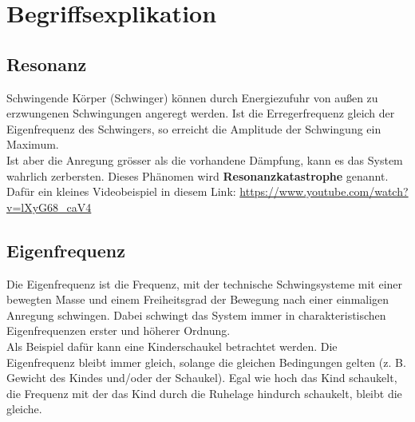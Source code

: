 \chapter{Begriffsexplikation}
\thispagestyle{fancy}
\label{chap:begriffsexplikation}
\section*{Resonanz}
\glqq Schwingende Körper (Schwinger) können durch Energiezufuhr von außen zu erzwungenen Schwingungen angeregt werden. Ist die Erregerfrequenz gleich der Eigenfrequenz des Schwingers, so erreicht die Amplitude der Schwingung ein Maximum.\grqq\: \cite{resonanz}\\
Ist aber die Anregung grösser als die vorhandene Dämpfung, kann es das System wahrlich zerbersten. Dieses Phänomen wird \textbf{Resonanzkatastrophe} genannt. \\
Dafür ein kleines Videobeispiel in diesem Link: \url{https://www.youtube.com/watch?v=lXyG68_caV4}

\section*{Eigenfrequenz}
\glqq Die Eigenfrequenz ist die Frequenz, mit der technische Schwingsysteme mit einer bewegten Masse und einem Freiheitsgrad der Bewegung nach einer einmaligen Anregung schwingen. Dabei schwingt das System immer in charakteristischen Eigenfrequenzen erster und höherer Ordnung.\grqq\: \cite{eigenfrequenz}\\
Als Beispiel dafür kann eine Kinderschaukel betrachtet werden. Die Eigenfrequenz bleibt immer gleich, solange die gleichen Bedingungen gelten (z. B. Gewicht des Kindes und/oder der Schaukel). Egal wie hoch das Kind schaukelt, die Frequenz mit der das Kind durch die Ruhelage hindurch schaukelt, bleibt die gleiche.